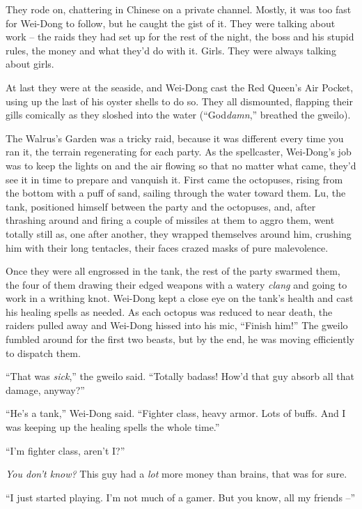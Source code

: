 They rode on, chattering in Chinese on a private channel. Mostly,
it was too fast for Wei-Dong to follow, but he caught the gist of
it. They were talking about work -- the raids they had set up for
the rest of the night, the boss and his stupid rules, the money and
what they'd do with it. Girls. They were always talking about
girls.

At last they were at the seaside, and Wei-Dong cast the Red Queen's
Air Pocket, using up the last of his oyster shells to do so. They
all dismounted, flapping their gills comically as they sloshed into
the water (``God\emph{damn},'' breathed the gweilo).

The Walrus's Garden was a tricky raid, because it was different
every time you ran it, the terrain regenerating for each party. As
the spellcaster, Wei-Dong's job was to keep the lights on and the
air flowing so that no matter what came, they'd see it in time to
prepare and vanquish it. First came the octopuses, rising from the
bottom with a puff of sand, sailing through the water toward them.
Lu, the tank, positioned himself between the party and the
octopuses, and, after thrashing around and firing a couple of
missiles at them to aggro them, went totally still as, one after
another, they wrapped themselves around him, crushing him with
their long tentacles, their faces crazed masks of pure
malevolence.

Once they were all engrossed in the tank, the rest of the party
swarmed them, the four of them drawing their edged weapons with a
watery \emph{clang} and going to work in a writhing knot. Wei-Dong
kept a close eye on the tank's health and cast his healing spells
as needed. As each octopus was reduced to near death, the raiders
pulled away and Wei-Dong hissed into his mic, ``Finish him!'' The
gweilo fumbled around for the first two beasts, but by the end, he
was moving efficiently to dispatch them.

``That was \emph{sick},'' the gweilo said. ``Totally badass! How'd
that guy absorb all that damage, anyway?''

``He's a tank,'' Wei-Dong said. ``Fighter class, heavy armor. Lots of
buffs. And I was keeping up the healing spells the whole time.''

``I'm fighter class, aren't I?''

\emph{You don't know?} This guy had a \emph{lot} more money than
brains, that was for sure.

``I just started playing. I'm not much of a gamer. But you know, all
my friends --''

